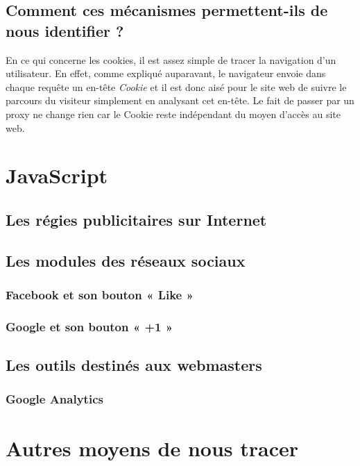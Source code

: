 \documentclass[a4paper,12pt,french]{report}
\begin{document}
	\section{Comment ces mécanismes permettent-ils de nous identifier ?}
En ce qui concerne les cookies, il est assez simple de tracer la navigation d'un utilisateur. En effet, comme expliqué auparavant, le navigateur envoie dans chaque requête un en-tête \textit{Cookie} et il est donc aisé pour le site web de suivre le parcours du visiteur simplement en analysant cet en-tête. Le fait de passer par un proxy ne change rien car le Cookie reste indépendant du moyen d'accès au site web.
		
\chapter{JavaScript}
	\section{Les régies publicitaires sur Internet}
		
	\section{Les modules des réseaux sociaux}
		
		\subsection{Facebook et son bouton « Like »}
			
		\subsection{Google et son bouton « +1 »}
			
	\section{Les outils destinés aux webmasters}
		
		\subsection{Google Analytics}
			
\chapter{Autres moyens de nous tracer}
\end{document}
